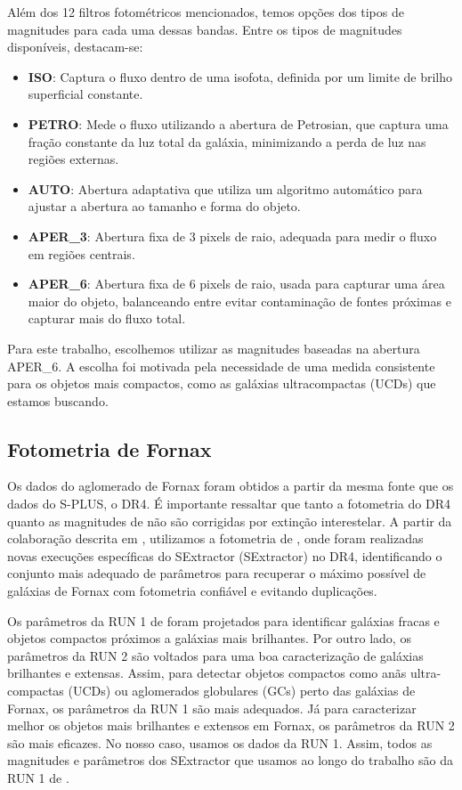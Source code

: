 Além dos 12 filtros fotométricos mencionados, temos opções dos tipos de magnitudes para cada uma dessas bandas. Entre os tipos de magnitudes disponíveis, destacam-se:

\begin{itemize}
    \item \textbf{ISO}: Captura o fluxo dentro de uma isofota, definida por um limite de brilho superficial constante.
    \item \textbf{PETRO}: Mede o fluxo utilizando a abertura de Petrosian, que captura uma fração constante da luz total da galáxia, minimizando a perda de luz nas regiões externas.
    \item \textbf{AUTO}: Abertura adaptativa que utiliza um algoritmo automático para ajustar a abertura ao tamanho e forma do objeto.
    \item \textbf{APER\_3}: Abertura fixa de 3 pixels de raio, adequada para medir o fluxo em regiões centrais.
    \item \textbf{APER\_6}: Abertura fixa de 6 pixels de raio, usada para capturar uma área maior do objeto, balanceando entre evitar contaminação de fontes próximas e capturar mais do fluxo total.
\end{itemize}

Para este trabalho, escolhemos utilizar as magnitudes baseadas na abertura APER\_6. A escolha foi motivada pela necessidade de uma medida consistente para os objetos mais compactos, como as galáxias ultracompactas (UCDs) que estamos buscando.

\subsection{Fotometria de Fornax}\label{sec:Fornax_data}
Os dados do aglomerado de Fornax foram obtidos a partir da mesma fonte que os dados do S-PLUS, o DR4. É importante ressaltar que tanto a fotometria do DR4 quanto as magnitudes de \cite{haack2024splusfornaxprojectsfp} não são corrigidas por extinção interestelar. A partir da colaboração descrita em \cite{castelli2024splusfornaxprojectsfp}, utilizamos a fotometria de \cite{haack2024splusfornaxprojectsfp}, onde foram realizadas novas execuções específicas do \ac{SExtractor} (SExtractor) no DR4, identificando o conjunto mais adequado de parâmetros para recuperar o máximo possível de galáxias de Fornax com fotometria confiável e evitando duplicações.

Os parâmetros da RUN 1 de \cite{haack2024splusfornaxprojectsfp} foram projetados para identificar galáxias fracas e objetos compactos próximos a galáxias mais brilhantes. Por outro lado, os parâmetros da RUN 2 são voltados para uma boa caracterização de galáxias brilhantes e extensas. Assim, para detectar objetos compactos como anãs ultra-compactas (UCDs) ou aglomerados globulares (GCs) perto das galáxias de Fornax, os parâmetros da RUN 1 são mais adequados. Já para caracterizar melhor os objetos mais brilhantes e extensos em Fornax, os parâmetros da RUN 2 são mais eficazes. No nosso caso, usamos os dados da RUN 1. Assim, todos as magnitudes e parâmetros dos \ac{SExtractor} que usamos ao longo do trabalho são da RUN 1 de \cite{haack2024splusfornaxprojectsfp}.

